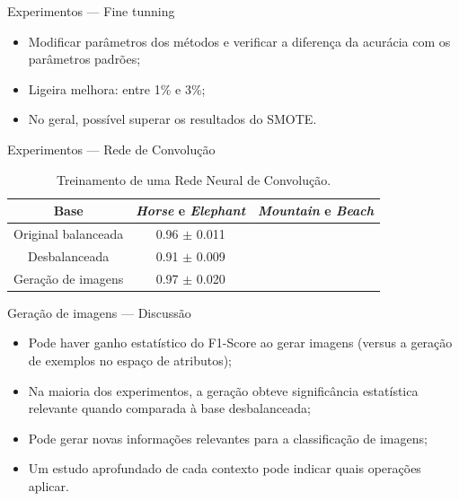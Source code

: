 \documentclass[10pt]{beamer}
\begin{document}
\begin{frame}{Experimentos --- Fine tunning}
  \setlength\leftmargini{1em}
  \begin{itemize}
    \item Modificar parâmetros dos métodos e verificar a diferença da acurácia com os parâmetros padrões;
    \item Ligeira melhora: entre 1\% e 3\%;
    \item No geral, possível superar os resultados do SMOTE.
  \end{itemize}
\end{frame}
\begin{frame}{Experimentos --- Rede de Convolução}
  \setlength\leftmargini{1em}
  \begin{table}
    \caption{Treinamento de uma Rede Neural de Convolução.}
    \begin{tabular}{c|c|c}
      Base                    &  \textit{Horse} e \textit{Elephant} & \textit{Mountain} e \textit{Beach}  \\ \hline
      Original balanceada     &  0.96 $\pm$ 0.011 \\
      Desbalanceada           &  0.91 $\pm$ 0.009 \\
      Geração de imagens      &  0.97 $\pm$ 0.020 \\
    \end{tabular}
  \end{table}
\end{frame}
\begin{frame}{Geração de imagens --- Discussão}
  \setlength\leftmargini{1em}
  \begin{itemize}
    \item Pode haver ganho estatístico do F1-Score ao gerar imagens (versus a geração de exemplos no espaço de atributos);
    \item Na maioria dos experimentos, a geração obteve significância estatística relevante quando comparada à base desbalanceada;
    \item Pode gerar novas informações relevantes para a classificação de imagens;
    \item Um estudo aprofundado de cada contexto pode indicar quais operações aplicar.
  \end{itemize}
\end{frame}
\end{document}
